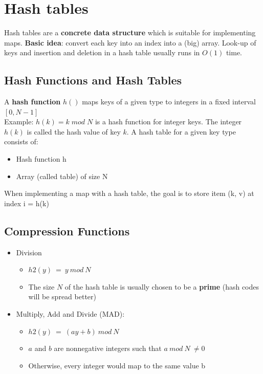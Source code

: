 \documentclass{article}
\begin{document}
\section{Hash tables}
\begin{flushleft}
Hash tables are a \textbf{concrete data structure} which is suitable for implementing maps. \textbf{Basic idea}: convert each key into an index into a (big) array. Look-up of keys and insertion and deletion in a hash table usually runs in $O(1)$ time.
\end{flushleft}

\subsection{Hash Functions and Hash Tables}
\begin{flushleft}
A \textbf{hash function} $h()$ maps keys of a given type to integers in a fixed interval $[0, N - 1]$\\
Example: $h(k) = k \; mod \; N$ is a hash function for integer keys. The integer $h(k)$ is called the hash value of key $k$. A hash table for a given key type consists of:
\begin{itemize}
	\item Hash function h
	\item Array (called table) of size N 
\end{itemize}
When implementing a map with a hash table, the goal is to store item (k, v) at index i = h(k)
\end{flushleft}

\subsection{Compression Functions}
\begin{itemize}
	\item Division
	\begin{itemize}
		\item $h2(y) \: = \: y \: mod \: N$
		\item The size $N$ of the hash table is usually chosen to be a \textbf{prime} (hash codes will be spread better)
	\end{itemize}
	\item Multiply, Add and Divide (MAD):
	\begin{itemize}
		\item $h2(y) \: = \: (ay +b) \: mod \: N$
		\item $a$ and $b$ are nonnegative integers such that $a \: mod \: N \: \neq 0$
		\item Otherwise, every integer would map to the same value b
	\end{itemize}
\end{itemize}
\pagebreak
\end{document}

